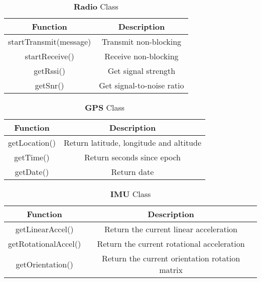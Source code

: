 \begin{table}[!htb]
  \centering
  \renewcommand{\arraystretch}{1.2}
  \begin{tabular}{ |c|c| }
  \hline
  \textbf{Function}        & \textbf{Description}    \\
  \hline
    startTransmit(message)              & Transmit non-blocking \\
    startReceive()                      & Receive non-blocking \\
    getRssi()                           & Get signal strength \\
    getSnr()                            & Get signal-to-noise ratio \\
  \hline
  \end{tabular}
  \caption{\textbf{Radio} Class}
  \label{tab:radioUML}
\end{table}

\begin{table}[!htb]
  \centering
  \renewcommand{\arraystretch}{1.2}
  \begin{tabular}{ |c|c| }
  \hline
  \textbf{Function}        & \textbf{Description}    \\
  \hline
    getLocation()              & Return latitude, longitude and altitude \\
    getTime()                  & Return seconds since epoch \\
    getDate()                  & Return date \\
  \hline
  \end{tabular}
  \caption{\textbf{GPS} Class}
  \label{tab:gpsUML}
\end{table}

\begin{table}[!htb]
  \centering
  \renewcommand{\arraystretch}{1.2}
  \begin{tabular}{ |c|c| }
  \hline
  \textbf{Function}        & \textbf{Description}    \\
  \hline
    getLinearAccel()              & Return the current linear acceleration \\
    getRotationalAccel()           & Return the current rotational acceleration \\
    getOrientation()                  & Return the current orientation rotation matrix \\
  \hline
  \end{tabular}
  \caption{\textbf{IMU} Class}
  \label{tab:imuUML}
\end{table}

